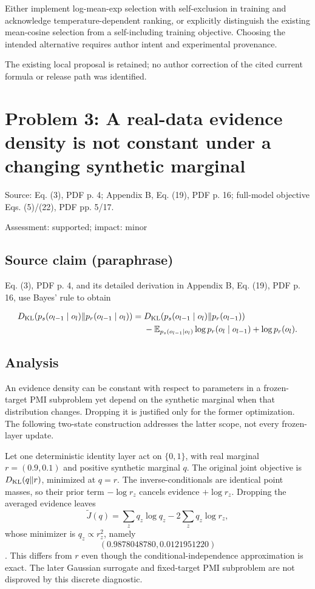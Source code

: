 \documentclass[11pt]{article}
\begin{document}
Either implement log-mean-exp selection with self-exclusion in training and acknowledge temperature-dependent ranking, or explicitly distinguish the existing mean-cosine selection from a self-including training objective. Choosing the intended alternative requires author intent and experimental provenance.

The existing local proposal is retained; no author correction of the cited current formula or release path was identified.

\section*{Problem 3: A real-data evidence density is not constant under a changing synthetic marginal}

Source: Eq. (3), PDF p. 4; Appendix B, Eq. (19), PDF p. 16; full-model objective Eqs. (5)/(22), PDF pp. 5/17.

Assessment: supported; impact: minor

\subsection*{Source claim (paraphrase)}

Eq. (3), PDF p. 4, and its detailed derivation in Appendix B, Eq. (19), PDF p. 16, use Bayes’ rule to obtain

\[ \begin{aligned} D_{\rm KL}(p_s(o_{l-1}\mid o_l)\Vert p_r(o_{l-1}\mid o_l)) ={}&D_{\rm KL}(p_s(o_{l-1}\mid o_l)\Vert p_r(o_{l-1}))\\ &-\mathbb E_{p_s(o_{l-1}\mid o_l)}\log p_r(o_l\mid o_{l-1}) +\log p_r(o_l). \end{aligned} \]

\subsection*{Analysis}

An evidence density can be constant with respect to parameters in a frozen-target PMI subproblem yet depend on the synthetic marginal when that distribution changes. Dropping it is justified only for the former optimization. The following two-state construction addresses the latter scope, not every frozen-layer update.

Let one deterministic identity layer act on \(\{0,1\}\), with real marginal \(r=(0.9,0.1)\) and positive synthetic marginal \(q\). The original joint objective is \(D_{\rm KL}(q\Vert r)\), minimized at \(q=r\). The inverse-conditionals are identical point masses, so their prior term \(-\log r_z\) cancels evidence \(+\log r_z\). Dropping the averaged evidence leaves \[\widetilde J(q)=\sum_zq_z\log q_z-2\sum_zq_z\log r_z,\] whose minimizer is \(q_z\propto r_z^2\), namely \[(0.9878048780,0.0121951220)\]. This differs from \(r\) even though the conditional-independence approximation is exact. The later Gaussian surrogate and fixed-target PMI subproblem are not disproved by this discrete diagnostic.
\end{document}

